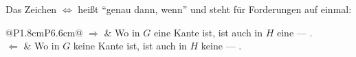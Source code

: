 \begin{merksatz}
Das Zeichen $\iff$ heißt \enquote{genau dann, wenn} und steht für  Forderungen auf einmal:

\begin{center}
\renewcommand{\arraystretch}{1.5}
\begin{tabular}{@{}P{1.8cm}P{6.6cm}@{}}
\toprule
$\Longrightarrow$ & Wo in $G$ eine Kante ist, ist auch in $H$ eine --- .\\
$\Longleftarrow$ & Wo in $G$ keine Kante ist, ist auch in $H$ keine --- .\\
\bottomrule
\end{tabular}
\end{center}

\begin{center}
\begin{minipage}{0.88\textwidth}
\end{minipage}
\end{center}
\end{merksatz}

